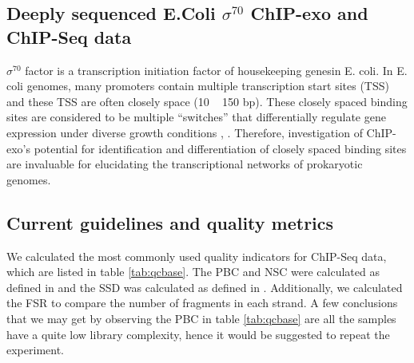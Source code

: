 \documentclass{bmcart}\usepackage[]{graphicx}\usepackage[]{color}
\begin{document}
\subsection{Deeply sequenced E.Coli $\sigma^{70}$ ChIP-exo and ChIP-Seq data}
\label{sec:ourdata}

$\sigma^{70}$ factor is a transcription initiation factor of
housekeeping genesin E. coli. In E. coli genomes, many promoters
contain multiple transcription start sites (TSS) and these TSS are
often closely space (10 ~ 150 bp). These closely spaced binding sites
are considered to be multiple ``switches'' that differentially
regulate gene expression under diverse growth conditions
\cite{regdb_old}, \cite{regulondb}. Therefore, investigation of
ChIP-exo's potential for identification and differentiation of closely
spaced binding sites are invaluable for elucidating the
transcriptional networks of prokaryotic genomes.

\subsection{Current guidelines and quality metrics}
\label{sec:qcnow}

We calculated the most commonly used quality indicators for ChIP-Seq
data, which are listed in table \ref{tab:qcbase}. The PBC and NSC were
calculated as defined in \cite{encode_qc} and the SSD was calculated
as defined in \cite{htseq}. Additionally, we calculated the FSR to
compare the number of fragments in each strand. A few conclusions that
we may get by observing the PBC in table \ref{tab:qcbase} are all the
samples have a quite low library complexity, hence it would be
suggested to repeat the experiment.
\end{document}
